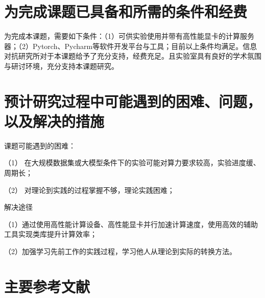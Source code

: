 \section{为完成课题已具备和所需的条件和经费}
为完成本课题，需要如下条件：（1）可供实验使用并带有高性能显卡的计算服务器；（2）Pytorch、Pycharm等软件开发平台与工具；目前以上条件均满足。信息对抗研究所对于本课题给予了充分支持，经费充足。且实验室具有良好的学术氛围与研讨环境，充分支持本课题研究。
\section{预计研究过程中可能遇到的困难、问题，以及解决的措施}
课题可能遇到的困难：
\par （1） 在大规模数据集或大模型条件下的实验可能对算力要求较高，实验进度缓、周期长；
\par （2） 对理论到实践的过程掌握不够，理论实践困难；
\par 解决途径
\par （1）通过使用高性能计算设备、高性能显卡并行加速计算速度，使用高效的辅助工具实现类库提升计算效率；
\par （2）加强学习先前工作的实践过程，学习他人从理论到实际的转换方法。
\section{主要参考文献}



